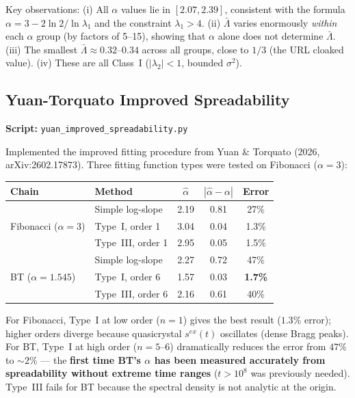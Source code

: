 \documentclass[11pt,letterpaper]{article}
\begin{document}
\medskip\noindent
Key observations: (i) All $\alpha$ values lie in $[2.07, 2.39]$, consistent with
the formula $\alpha = 3 - 2\ln 2/\ln\lambda_1$ and the constraint $\lambda_1 > 4$.
(ii) $\bar\Lambda$ varies enormously \emph{within} each $\alpha$ group (by factors of 5--15),
showing that $\alpha$ alone does not determine $\bar\Lambda$.
(iii) The smallest $\bar\Lambda \approx 0.32$--$0.34$ across all groups, close to $1/3$
(the URL cloaked value).
(iv) These are all Class~I ($|\lambda_2| < 1$, bounded $\sigma^2$).

\subsection{Yuan-Torquato Improved Spreadability}

\textbf{Script:} \texttt{yuan\_improved\_spreadability.py}

Implemented the improved fitting procedure from Yuan \& Torquato (2026, arXiv:2602.17873).
Three fitting function types were tested on Fibonacci ($\alpha = 3$):

\medskip
\noindent\begin{tabular}{llccc}
\toprule
\textbf{Chain} & \textbf{Method} & $\hat\alpha$ & $|\hat\alpha - \alpha|$ & Error \\
\midrule
\multirow{3}{*}{Fibonacci ($\alpha = 3$)}
  & Simple log-slope      & 2.19  & 0.81 & 27\% \\
  & Type~I, order 1       & 3.04  & 0.04 & 1.3\% \\
  & Type~III, order 1     & 2.95  & 0.05 & 1.5\% \\
\midrule
\multirow{3}{*}{BT ($\alpha = 1.545$)}
  & Simple log-slope      & 2.27  & 0.72 & 47\% \\
  & Type~I, order 6       & 1.57  & 0.03 & \textbf{1.7\%} \\
  & Type~III, order 6     & 2.16  & 0.61 & 40\% \\
\bottomrule
\end{tabular}

\medskip\noindent
For Fibonacci, Type~I at low order ($n = 1$) gives the best result ($1.3\%$ error);
higher orders diverge because quasicrystal $s^{ex}(t)$ oscillates (dense Bragg peaks).
For BT, Type~I at high order ($n = 5$--$6$) dramatically reduces the error from $47\%$
to $\sim\!2\%$ --- the \textbf{first time BT's $\alpha$ has been measured accurately from
spreadability without extreme time ranges} ($t > 10^8$ was previously needed).
Type~III fails for BT because the spectral density is not analytic at the origin.
\end{document}
